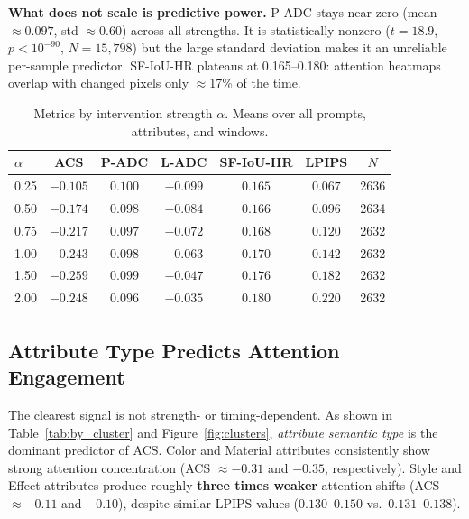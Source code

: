 \documentclass{article}
\begin{document}
\textbf{What does not scale is predictive power.}
P-ADC stays near zero (mean $\approx 0.097$, std $\approx 0.60$)
across all strengths.  It is statistically nonzero ($t=18.9$,
$p < 10^{-90}$, $N=15{,}798$) but the large standard deviation
makes it an unreliable per-sample predictor.  SF-IoU-HR
plateaus at 0.165--0.180: attention heatmaps overlap with changed
pixels only $\approx$17\% of the time.

\begin{table}[t]
\centering
\caption{Metrics by intervention strength $\alpha$.
         Means over all prompts, attributes, and windows.}
\label{tab:by_strength}
\vskip 0.05in
\setlength{\tabcolsep}{3.5pt}
\footnotesize
\begin{tabular}{@{}lcccccc@{}}
\toprule
$\alpha$ & ACS & P-ADC & L-ADC & SF-IoU-HR & LPIPS & $N$ \\
\midrule
0.25 & $-0.105$ & $0.100$ & $-0.099$ & $0.165$ & $0.067$ & 2636 \\
0.50 & $-0.174$ & $0.098$ & $-0.084$ & $0.166$ & $0.096$ & 2634 \\
0.75 & $-0.217$ & $0.097$ & $-0.072$ & $0.168$ & $0.120$ & 2632 \\
1.00 & $-0.243$ & $0.098$ & $-0.063$ & $0.170$ & $0.142$ & 2632 \\
1.50 & $-0.259$ & $0.099$ & $-0.047$ & $0.176$ & $0.182$ & 2632 \\
2.00 & $-0.248$ & $0.096$ & $-0.035$ & $0.180$ & $0.220$ & 2632 \\
\bottomrule
\end{tabular}
\end{table}

\subsection{Attribute Type Predicts Attention Engagement}

The clearest signal is not strength- or timing-dependent.
As shown in Table~\ref{tab:by_cluster} and Figure~\ref{fig:clusters},
\emph{attribute semantic type} is the dominant predictor of ACS.
Color and Material attributes consistently show strong attention
concentration (ACS $\approx -0.31$ and $-0.35$, respectively).
Style and Effect attributes produce roughly \textbf{three times
weaker} attention shifts (ACS $\approx -0.11$ and $-0.10$), despite
similar LPIPS values ($0.130$--$0.150$ vs.\ $0.131$--$0.138$).
\end{document}
